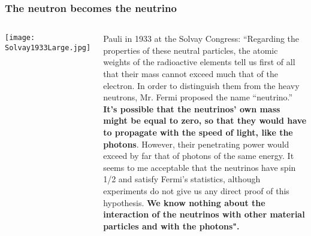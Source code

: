 \begin{frame}
\frametitle{The neutron becomes the neutrino}
\begin{columns}
\texttt{[image: Solvay1933Large.jpg]}
 
Pauli in  1933 at the Solvay Congress: ``Regarding the properties of these neutral particles, the atomic weights
of the radioactive elements tell us first of all that their mass cannot exceed
much that of the electron. In order to distinguish them from the heavy
neutrons, Mr. Fermi proposed the name ``neutrino.'' {\bf It's possible that the
neutrinos' own mass might be equal to zero, so that they would have to
propagate with the speed of light, like the photons}. However, their penetrating power would exceed by far that of photons of the same energy. It
seems to me acceptable that the neutrinos have spin 1/2 and satisfy Fermi's 
statistics, although experiments do not give us any direct proof of this hypothesis. 
{\bf We know nothing about the interaction of the neutrinos with other material particles and with the photons".}

\end{columns}
\end{frame}
